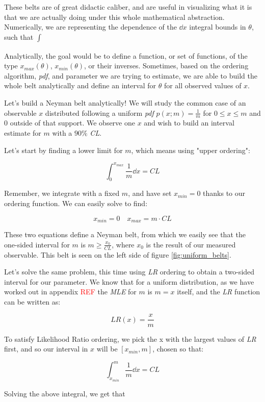 These belts are of great didactic caliber, and are useful in visualizing what it is that we are actually doing under this whole mathematical abstraction. Numerically, we are representing the dependence of the $\dd x$ integral bounds in $\theta$, such that $\int_{}$

Analytically, the goal would be to define a function, or set of functions, of the type $x_{max}(\theta)$, $x_{min}(\theta)$, or their inverses. Sometimes, based on the ordering algorithm, \emph{pdf}, and parameter we are trying to estimate, we are able to build the whole belt analytically and define an interval for $\theta$ for all observed values of $x$. 


\begin{example}
	Let's build a Neyman belt analytically! We will study the common case of an observable $x$ distributed following a uniform \emph{pdf} $p(x;m) = \frac{1}{m}$ for $0\leq x \leq m$ and $0$ outside of that support. We observe one $x$ and wish to build an interval estimate for $m$ with a $90\%$ \emph{CL}. 
	
	Let's start by finding a lower limit for $m$, which means using "upper ordering":
	
	\[
	\int_0^{x_{max}} \frac{1}{m}\dd x = CL
	\]
	
	Remember, we integrate with a fixed $m$, and have set $x_{min}=0$ thanks to our ordering function. We can easily solve to find:
	
	\[
	x_{min} = 0 \quad x_{max} = m\cdot CL
	\]
	
	These two equations define a Neyman belt, from which we easily see that the one-sided interval for $m$ is $m\geq \frac{x_0}{CL}$, where $x_0$ is the result of our measured observable. This belt is seen on the left side of figure \ref{fig:uniform_belts}.
	
	Let's solve the same problem, this time using \emph{LR} ordering to obtain a two-sided interval for our parameter. We know that for a uniform distribution, as we have worked out in appendix \textcolor{red}{REF} the \emph{MLE} for $m$ is $m=x$ itself, and the \emph{LR} function can be written as:
	
	\[
	LR(x) = \frac{x}{m}
	\]
	
	To satisfy Likelihood Ratio ordering, we pick the x with the largest values of \emph{LR} first, and so our interval in $x$ will be $[x_{min}, m]$, chosen so that:
	
	\[
	\int_{x_{min}}^m \frac{1}{m}\dd x = CL
	\]
	
	Solving the above integral, we get that
	

\end{example}
